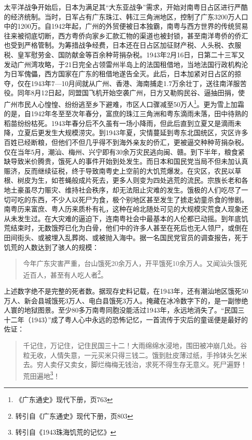 太平洋战争开始后，日本为满足其“大东亚战争”需求，开始对南粤日占区进行严酷的经济统制。当时，日军占有广东珠江、韩江三角洲地区，控制了广东3200万人口中的1200万。自1942年起，广州的外贸便被日本独霸，南粤与西方世界的传统贸易往来被彻底切断，西方粤侨向家乡汇款汇物的渠道也被封锁，甚至南洋粤侨的侨汇也受到严格管制。为筹措战争经费，日本还在日占区加征财产税、人头税、衣服税、皇军慰劳金、国防献金等百余种苛捐杂税。1943年2月16日，日第二十三军又发动广州湾攻略，于21日完全占领雷州半岛上的法国租借地，当地法国行政机构沦为日军傀儡，西方国家在广东的租借地遂告全灭。此后，日本加紧对日占区的掠夺，仅在1943年7—10月间就从广州、香港、海南捕走1.7万余壮丁，送往南洋服苦役。同年8月12日起，同盟国飞机开始空袭广州，日方又勒购民谷、逼抽田捐，使广州市民人心惶惶、纷纷逃至乡下避难，市区人口骤减至50万人\footnote{《广东通史》现代下册，页763}。更为雪上加霜的是，自1942年冬至至次年春分，富庶的珠江三角洲和粤东滴雨未落，田中待熟的稻苗纷纷枯死。1943年春分后不久虽有一场小降雨，但此后直到立夏又是滴雨未降，立夏后更发生大规模涝灾。到1943年夏，灾情蔓延到粤东北国统区，灾区许多百姓已经断粮，但他们不但几乎得不到海外亲友的侨汇，更被逼交种种苛捐杂税。仅在当年5月，潮汕、梅州、兴宁即有30余万灾民逃向闽、赣。到下半年，粮食紧缺导致米价腾贵，饿死人的事件开始到处发生。而日本和国民党当局不但未加认真赈济，反而继续征税，终于导致南粤史上空前的大饥荒爆发。在灾区，农民以草根、树皮为生，如苍蝇般成片死去，更多人则变为四处逃荒的流民。宗族长老和各地土豪虽尽力赈灾、维持社会秩序，却无法阻止灾难的发生。饿极的人们吃尽了一切可吃的东西，不少人以死尸为食，极个别地区甚至发生了掳走幼童杀食的惨剧。南粤历来富庶、粤人历来质朴有礼，这种在岭北随处可见的大规模灾荒食人现象还从未发生过。在大灾难的逼迫下，连南粤社会中最基本的人伦都已动摇。到年底饥荒结束时，无数饿殍已化为白骨，他们中的许多人甚至在死后也无人领尸，或倒在田间街头、或被埋入乱葬岗、或被抛入海中。据一名国民党官员的调查报告，死于饥荒的人数达到了骇人的规模：

\begin{quote}
今年广东灾害严重，台山饿死20余万人，开平饿死10余万人。又闻汕头饿死近百人，甚至有人吃人者\footnote{转引自《广东通史》现代下册，页803}。
\end{quote}

上述数字绝不是完整的死者数。据现存史料记载，在1943年，还有潮汕地区饿死50万人、新会县城饿死3万人、电白县饿死3万人。掩藏在冰冷数字下的，是一副惨绝人寰的地狱图景。至少80多万南粤同胞没能活过1943年，永远地消失了。“民国三十二年（1943）”成了粤人心中永远的恐怖记忆，一首流传于灾后的童谣便是最好的佐证：

\begin{quote}
千记住，万记住，记住民国三十二！大雨绵绵水浸地，围田被冲崩几处。谷粒无收，人情失意，一元买米只得三钱二。饿到肚皮薄过纸，手拎钵头乞米去。穷人卖仔又卖女，脚烂梅梅无钱治，求死不得生存无意义。死尸遍野！荒田遍地\footnote{转引自《1943珠海饥荒的记忆》}！
\end{quote}

